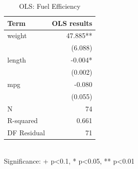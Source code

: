 \begin{table}[!htbp]
\centering
\caption{OLS: Fuel Efficiency}
\begin{tabular}{lr}
\toprule
Term & OLS results \\
\midrule
weight & 47.885** \\
 & (6.088) \\
length & -0.004* \\
 & (0.002) \\
mpg & -0.080 \\
 & (0.055) \\
N & 74 \\
R-squared & 0.661 \\
DF Residual & 71 \\
\bottomrule
\end{tabular}
\\
\footnotesize{Significance: + p<0.1, * p<0.05, ** p<0.01}\\
\end{table}


